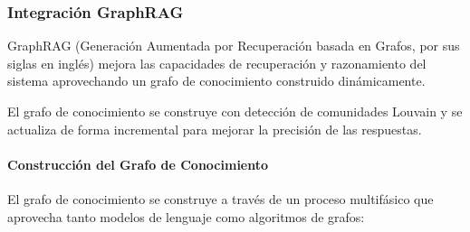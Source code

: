 \documentclass[12pt]{article}
\begin{document}
\subsubsection{Integración GraphRAG}
GraphRAG (Generación Aumentada por Recuperación basada en Grafos, por sus siglas en inglés) mejora las capacidades de recuperación y razonamiento del sistema aprovechando un grafo de conocimiento construido dinámicamente\cite{edge2025localglobalgraphrag,Ji2020ASO}.

El grafo de conocimiento se construye con detección de comunidades Louvain\cite{Traag2018FromLT} y se actualiza de forma incremental para mejorar la precisión de las respuestas\cite{Lewis2020RetrievalAugmentedGF}.

\paragraph{Construcción del Grafo de Conocimiento}
El grafo de conocimiento se construye a través de un proceso multifásico que aprovecha tanto modelos de lenguaje como algoritmos de grafos:
\end{document}
